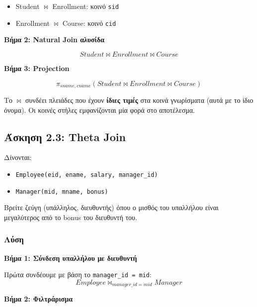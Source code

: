 \begin{itemize}
    \item Student $\bowtie$ Enrollment: κοινό \texttt{sid}
    \item Enrollment $\bowtie$ Course: κοινό \texttt{cid}
\end{itemize}

\textbf{Βήμα 2: Natural Join αλυσίδα}

$$Student \bowtie Enrollment \bowtie Course$$

\textbf{Βήμα 3: Projection}

$$\pi_{sname, cname}(Student \bowtie Enrollment \bowtie Course)$$

\begin{infobox}
Το $\bowtie$ συνδέει πλειάδες που έχουν \textbf{ίδιες τιμές} στα κοινά γνωρίσματα
(αυτά με το ίδιο όνομα). Οι κοινές στήλες εμφανίζονται μία φορά στο αποτέλεσμα.
\end{infobox}

\subsection{Άσκηση 2.3: Theta Join}

\begin{formulabox}[Εκφώνηση]
Δίνονται:
\begin{itemize}
    \item \texttt{Employee(eid, ename, salary, manager\_id)}
    \item \texttt{Manager(mid, mname, bonus)}
\end{itemize}

Βρείτε ζεύγη (υπάλληλος, διευθυντής) όπου ο μισθός του υπαλλήλου είναι
μεγαλύτερος από το bonus του διευθυντή του.
\end{formulabox}

\subsubsection*{Λύση}

\textbf{Βήμα 1: Σύνδεση υπαλλήλου με διευθυντή}

Πρώτα συνδέουμε με βάση το \texttt{manager\_id = mid}:
$$Employee \bowtie_{manager\_id = mid} Manager$$

\textbf{Βήμα 2: Φιλτράρισμα}

